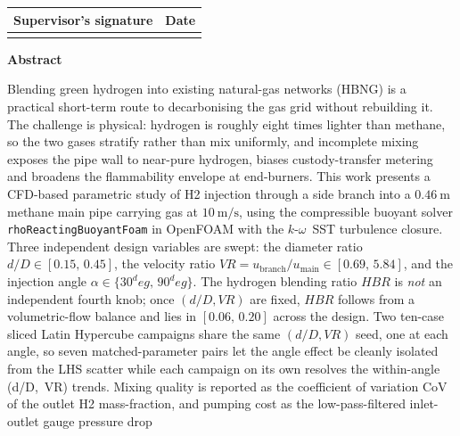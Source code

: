 \documentclass[11pt,a4paper]{article}
\def\Hi{H2}%
\def\dD{d/D}%
\def\VR{VR}%
\def\HBR{HBR}%
\def\CoV{CoV}%
\def\circ{ deg}%
\newcommand{\Hi}{\ensuremath{\mathrm{H_2}}}
\newcommand{\dD}{\ensuremath{d/D}}
\newcommand{\VR}{\ensuremath{\mathrm{VR}}}
\newcommand{\HBR}{\ensuremath{\mathrm{HBR}}}
\newcommand{\CoV}{\ensuremath{\mathrm{CoV}}}
\begin{document}
\begin{titlepage}
    \vfill
    \renewcommand{\arraystretch}{1.4}
    \begin{tabular}{|p{}|p{}|}
        \hline
        \centering \textbf{Supervisor's signature} &
        \centering \textbf{Date} \tabularnewline
        \hline
        \vspace{1.2cm} & \vspace{1.2cm} \tabularnewline
        \hline
    \end{tabular}
    \vspace*{0.2cm}
\end{titlepage}

\begin{center}
    {\Large \bfseries \sffamily Abstract}
\end{center}
\noindent
Blending green hydrogen into existing natural-gas networks (HBNG) is
a practical short-term route to decarbonising the gas grid without
rebuilding it. The challenge is physical: hydrogen is roughly eight
times lighter than methane, so the two gases stratify rather than
mix uniformly, and incomplete mixing exposes the pipe wall to
near-pure hydrogen, biases custody-transfer metering and broadens the
flammability envelope at end-burners. This work presents a CFD-based
parametric study of \Hi{} injection through a side branch into a
\(\SI{0.46}{\meter}\) methane main pipe carrying gas at
\(\SI{10}{\meter\per\second}\), using the compressible buoyant solver
\texttt{rhoReactingBuoyantFoam} in OpenFOAM with the
\(k\)-\(\omega\)~SST turbulence closure. Three independent design variables
are swept: the diameter ratio \(\dD\in[0.15,\,0.45]\), the velocity
ratio \(\VR=u_{\mathrm{branch}}/u_{\mathrm{main}}\in[0.69,\,5.84]\),
and the injection angle \(\alpha\in\{30^\circ,\,90^\circ\}\). The
hydrogen blending ratio \(\HBR\) is \emph{not} an independent
fourth knob; once \((\dD,\VR)\) are fixed, \(\HBR\) follows from a
volumetric-flow balance and lies in \([0.06,\,0.20]\) across the
design. Two ten-case sliced Latin Hypercube campaigns share the
same \((\dD,\VR)\) seed, one at each angle, so seven
matched-parameter pairs let the angle effect be cleanly isolated
from the LHS scatter while each campaign on its own resolves the
within-angle (\dD,~\VR) trends. Mixing quality is reported
as the coefficient of variation \CoV{} of the outlet \Hi{}
mass-fraction, and pumping cost as the low-pass-filtered
inlet-outlet gauge pressure drop
\end{document}
